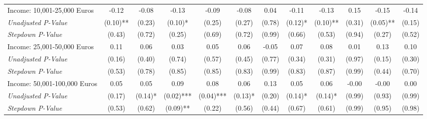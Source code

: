 \begin{tabular}{l c c c c c c c c c c c}
Income: 10,001-25,000 Euros & -0.12 & -0.08 & -0.13 & -0.09 & -0.08 & 0.04 & -0.11 & -0.13 & 0.15 & -0.15 & -0.14 \\
\quad \textit{Unadjusted P-Value} & (0.10)** & (0.23) & (0.10)* & (0.25) & (0.27) & (0.78) & (0.12)* & (0.10)** & (0.31) & (0.05)** & (0.15) \\
\quad \textit{Stepdown P-Value} & (0.43) & (0.72) & (0.25) & (0.69) & (0.72) & (0.99) & (0.66) & (0.53) & (0.94) & (0.27) & (0.52) \\
Income: 25,001-50,000 Euros & 0.11 & 0.06 & 0.03 & 0.05 & 0.06 & -0.05 & 0.07 & 0.08 & 0.01 & 0.13 & 0.10 \\
\quad \textit{Unadjusted P-Value} & (0.16) & (0.40) & (0.74) & (0.57) & (0.45) & (0.77) & (0.34) & (0.31) & (0.97) & (0.15) & (0.30) \\
\quad \textit{Stepdown P-Value} & (0.53) & (0.78) & (0.85) & (0.85) & (0.83) & (0.99) & (0.83) & (0.87) & (0.99) & (0.44) & (0.70) \\
Income: 50,001-100,000 Euros & 0.05 & 0.05 & 0.09 & 0.08 & 0.06 & 0.13 & 0.05 & 0.06 & -0.00 & -0.00 & 0.00 \\
\quad \textit{Unadjusted P-Value} & (0.17) & (0.14)* & (0.02)*** & (0.04)*** & (0.13)* & (0.20) & (0.14)* & (0.14)* & (0.99) & (0.93) & (0.99) \\
\quad \textit{Stepdown P-Value} & (0.53) & (0.62) & (0.09)** & (0.22) & (0.56) & (0.44) & (0.67) & (0.61) & (0.99) & (0.95) & (0.98) \\
\bottomrule
\end{tabular}
